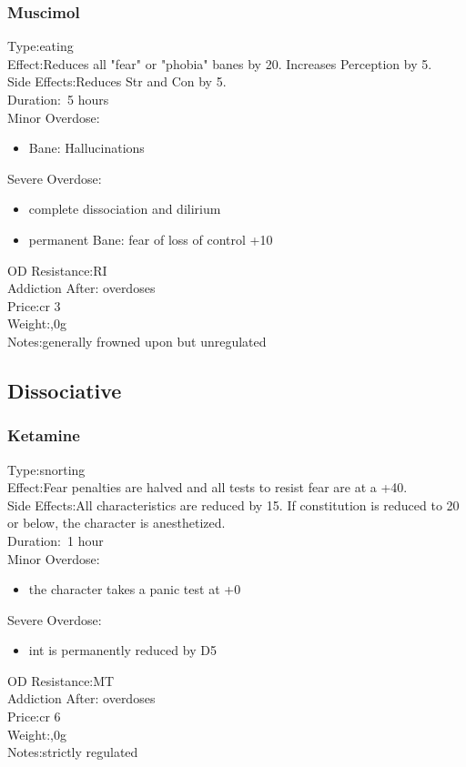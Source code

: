 \subsubsection{Muscimol}
Type:\tab eating\\
Effect:\tab Reduces all "fear" or "phobia" banes by 20. Increases Perception by 5.\\
Side Effects:\tab Reduces Str and Con by 5.\\
Duration:\tab ~5 hours\\
Minor Overdose:\\
\begin{itemize}
	\setlength\itemsep{-8mm}
	\vspace{-12mm}
	\item Bane: Hallucinations
\end{itemize}
Severe Overdose:\\
\begin{itemize}
	\setlength\itemsep{-8mm}
	\vspace{-12mm}
	\item complete dissociation and dilirium
	\item permanent Bane: fear of loss of control +10
\end{itemize}
OD Resistance:\tab RI\\
Addiction After: overdoses\\
Price:\tab cr 3\\
Weight:,0g\\
Notes:\tab generally frowned upon but unregulated


\subsection{Dissociative}
\subsubsection{Ketamine}
Type:\tab snorting\\
Effect:\tab Fear penalties are halved and all tests to resist fear are at a +40.\\
Side Effects:\tab All characteristics are reduced by 15. If constitution is reduced to 20 or below, the character is anesthetized.\\
Duration:\tab ~1 hour\\
Minor Overdose:\\
\begin{itemize}
	\setlength\itemsep{-8mm}
	\vspace{-12mm}
	\item the character takes a panic test at +0
\end{itemize}
Severe Overdose:\\
\begin{itemize}
	\setlength\itemsep{-8mm}
	\vspace{-12mm}
	\item int is permanently reduced by D5
\end{itemize}
OD Resistance:\tab MT\\
Addiction After: overdoses\\
Price:\tab cr 6\\
Weight:,0g\\
Notes:\tab strictly regulated


